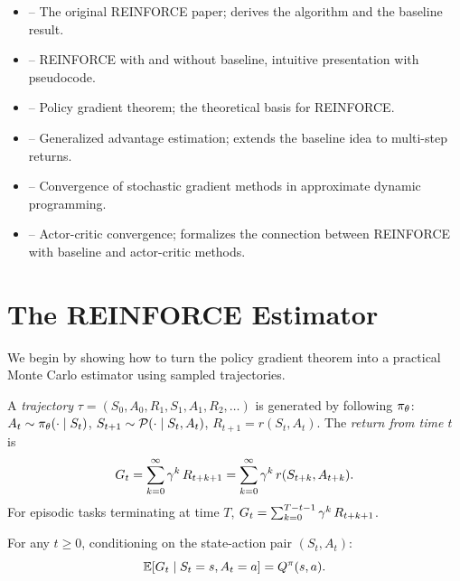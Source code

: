 \documentclass[11pt,a4paper]{article}
\begin{document}
\begin{itemize}
  \item \citet{williams1992} -- The original REINFORCE paper; derives the
    algorithm and the baseline result.
  \item \citet[Chapter 13]{suttonbarto2018} -- REINFORCE with and without
    baseline, intuitive presentation with pseudocode.
  \item \citet{sutton2000} -- Policy gradient theorem; the theoretical
    basis for REINFORCE.
  \item \citet{schulman2015} -- Generalized advantage estimation; extends
    the baseline idea to multi-step returns.
  \item \citet[Chapter 6]{bertsekas1996} -- Convergence of stochastic
    gradient methods in approximate dynamic programming.
  \item \citet{konda2003} -- Actor-critic convergence; formalizes the
    connection between REINFORCE with baseline and actor-critic methods.
\end{itemize}

\section{The REINFORCE Estimator}

We begin by showing how to turn the policy gradient theorem into a
practical Monte Carlo estimator using sampled trajectories.

\begin{definition}
\label{def:trajectory}
A \emph{trajectory} $\tau = (S_0, A_0, R_1, S_1, A_1, R_2, \ldots)$
is generated by following $\pi_\theta$: $A_t \sim
\pi_\theta(\cdot \mid S_t)$, $S_{t+1} \sim \mathcal{P}(\cdot \mid S_t, A_t)$,
$R_{t+1} = r(S_t, A_t)$. The \emph{return from time $t$} is
\[
  G_t = \sum_{k=0}^{\infty} \gamma^k\, R_{t+k+1}
      = \sum_{k=0}^{\infty} \gamma^k\, r(S_{t+k}, A_{t+k}).
\]
For episodic tasks terminating at time $T$, $G_t = \sum_{k=0}^{T-t-1}
\gamma^k\, R_{t+k+1}$.
\end{definition}

\begin{lemma}
\label{lem:return-unbiased}
For any $t \geq 0$, conditioning on the state-action pair $(S_t, A_t)$:
\[
  \mathbb{E}[G_t \mid S_t = s, A_t = a] = Q^{\pi}(s, a).
\]
\end{lemma}
\end{document}
